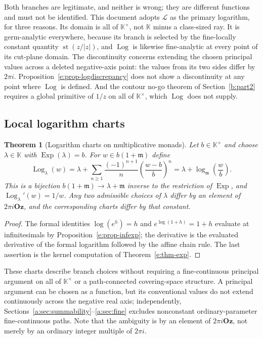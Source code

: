 \documentclass[11pt,a4paper]{article}
\numberwithin{equation}{section}
\newtheorem{theorem}{Theorem}[section]
\theoremstyle{definition}
\theoremstyle{remark}
\theoremstyle{plain}
\newcommand{\K}{\mathbb K}
\newcommand{\Oz}{\mathbf{Oz}}
\newcommand{\mm}{\mathfrak m}
\DeclareMathOperator{\st}{st}
\DeclareMathOperator{\Log}{Log}
\DeclareMathOperator{\Exp}{Exp}
\newcommand{\abs}[1]{\lvert #1\rvert}
\begin{document}
Both branches are legitimate, and neither is wrong; they are different
functions and must not be identified.  This document adopts $\mathcal L$
as the primary logarithm, for three reasons.  Its domain is all of
$\K^{\times}$, not $\K$ minus a class-sized ray.  It is germ-analytic
everywhere, because its branch is selected by the fine-locally constant
quantity $\st(z/\abs z)$, and $\Log$ is likewise fine-analytic at every point of its cut-plane
domain. The discontinuity concerns extending the chosen principal
values across a deleted negative-axis point: the values from its two
sides differ by $2\pi i$. Proposition~\ref{e:prop-logdiscrepancy}
does not show a discontinuity at any point where $\Log$ is defined.  And the contour no-go theorem of
Section~\ref{b:part2} requires a global primitive of $1/z$ on all of $\K^{\times}$, which
$\Log$ does not supply.

\subsection{Local logarithm charts}\label{e:sec-logcharts}

\begin{theorem}[Logarithm charts on multiplicative monads]
\label{e:thm-logcharts}
Let $b\in\K^{\times}$ and choose $\lambda\in\K$ with $\Exp(\lambda)=b$.
For $w\in b(1+\mm)$ define
\[
 \Log_\lambda(w)=\lambda+\sum_{n\ge1}\frac{(-1)^{n+1}}{n}
   \left(\frac{w-b}{b}\right)^{n}
 =\lambda+\log_{\mm}\!\left(\frac wb\right).
\]
This is a bijection $b(1+\mm)\to\lambda+\mm$ inverse to the restriction of
$\Exp$, and $\Log_\lambda'(w)=1/w$.  Any two admissible choices of
$\lambda$ differ by an element of $2\pi i\Oz$, and the corresponding charts
differ by that constant.
\end{theorem}

\begin{proof}
The formal identities $\log(e^h)=h$ and $e^{\log(1+h)}=1+h$ evaluate at
infinitesimals by Proposition~\ref{e:prop-infexp}; the derivative is the
evaluated derivative of the formal logarithm followed by the affine chain
rule.  The last assertion is the kernel computation of
Theorem~\ref{e:thm-exp}.
\end{proof}

These charts describe branch choices without requiring a
fine-continuous principal argument on all of $\K^\times$ or a
path-connected covering-space structure. A principal argument can be
chosen as a function, but its conventional values do not extend
continuously across the negative real axis; independently, Sections~\ref{a:sec:summability}--\ref{a:sec:fine}
excludes nonconstant ordinary-parameter fine-continuous paths.  Note that the ambiguity is by an element of
$2\pi i\Oz$, not merely by an ordinary integer multiple of $2\pi i$.
\end{document}
